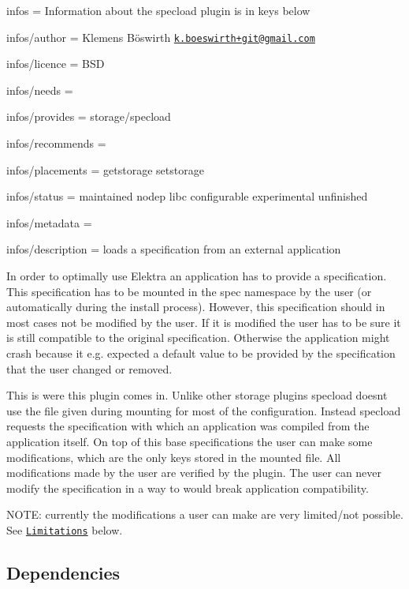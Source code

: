 
\begin{DoxyItemize}
\item infos = Information about the specload plugin is in keys below
\item infos/author = Klemens Böswirth \href{mailto:k.boeswirth+git@gmail.com}{\tt k.\+boeswirth+git@gmail.\+com}
\item infos/licence = B\+SD
\item infos/needs =
\item infos/provides = storage/specload
\item infos/recommends =
\item infos/placements = getstorage setstorage
\item infos/status = maintained nodep libc configurable experimental unfinished
\item infos/metadata =
\item infos/description = loads a specification from an external application
\end{DoxyItemize}

In order to optimally use Elektra an application has to provide a specification. This specification has to be mounted in the {\ttfamily spec} namespace by the user (or automatically during the install process). However, this specification should in most cases not be modified by the user. If it is modified the user has to be sure it is still compatible to the original specification. Otherwise the application might crash because it e.\+g. expected a default value to be provided by the specification that the user changed or removed.

This is were this plugin comes in. Unlike other storage plugins {\ttfamily specload} doesn\textquotesingle{}t use the file given during mounting for most of the configuration. Instead {\ttfamily specload} requests the specification with which an application was compiled from the application itself. On top of this base specifications the user can make some modifications, which are the only keys stored in the mounted file. All modifications made by the user are verified by the plugin. The user can never modify the specification in a way to would break application compatibility.

N\+O\+TE\+: currently the modifications a user can make are very limited/not possible. See \href{#limitations}{\tt Limitations} below.

\subsection*{Dependencies}


